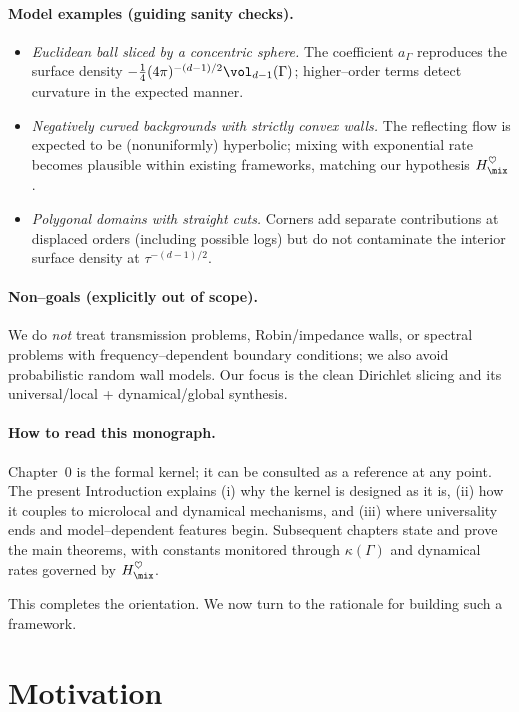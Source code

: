 \paragraph{Model examples (guiding sanity checks).}
\begin{itemize}
  \item \emph{Euclidean ball sliced by a concentric sphere.} The coefficient $a_\Gamma$ reproduces the surface density $-\frac14 (4\pi)^{-(d-1)/2}\vol_{d-1}(\Gamma)$; higher–order terms detect curvature in the expected manner.
  \item \emph{Negatively curved backgrounds with strictly convex walls.} The reflecting flow is expected to be (nonuniformly) hyperbolic; mixing with exponential rate becomes plausible within existing frameworks, matching our hypothesis $H_{\mix}^\heartsuit$.
  \item \emph{Polygonal domains with straight cuts.} Corners add separate contributions at displaced orders (including possible logs) but do not contaminate the interior surface density at $\tau^{-(d-1)/2}$.
\end{itemize}

\paragraph{Non–goals (explicitly out of scope).}
We do \emph{not} treat transmission problems, Robin/impedance walls, or spectral problems with frequency–dependent boundary conditions; we also avoid probabilistic random wall models. Our focus is the clean Dirichlet slicing and its universal/local + dynamical/global synthesis.

\paragraph{How to read this monograph.}
Chapter~0 is the formal kernel; it can be consulted as a reference at any point. The present Introduction explains (i) why the kernel is designed as it is, (ii) how it couples to microlocal and dynamical mechanisms, and (iii) where universality ends and model–dependent features begin. Subsequent chapters state and prove the main theorems, with constants monitored through $\kappa(\Gamma)$ and dynamical rates governed by $H_{\mix}^\heartsuit$.

\medskip
This completes the orientation. We now turn to the rationale for building such a framework.

\section*{Motivation}

